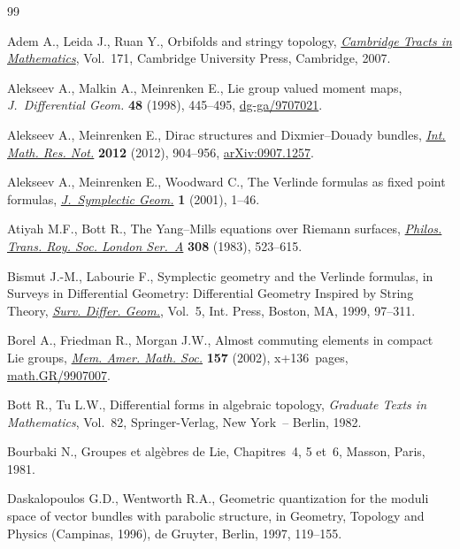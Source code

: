 \documentclass[pdftex]{sigma}
\numberwithin{equation}{section}
\begin{document}
\begin{thebibliography}{99}
\footnotesize \itemsep=0pt

Adem A., Leida J., Ruan Y., Orbifolds and stringy topology, \href{http://dx.doi.org/10.1017/CBO9780511543081}{\textit{Cambridge
  Tracts in Mathematics}}, Vol.~171, Cambridge University Press, Cambridge,
  2007.

Alekseev A., Malkin A., Meinrenken E., Lie group valued moment maps,
  \textit{J.~Differential Geom.} \textbf{48} (1998), 445--495,
  \href{http://arxiv.org/abs/dg-ga/9707021}{dg-ga/9707021}.

Alekseev A., Meinrenken E., Dirac structures and {D}ixmier--{D}ouady bundles,
  \href{http://dx.doi.org/10.1093/imrn/rnr002}{\textit{Int. Math. Res. Not.}} \textbf{2012} (2012), 904--956,
  \href{http://arxiv.org/abs/0907.1257}{arXiv:0907.1257}.

Alekseev A., Meinrenken E., Woodward C., The {V}erlinde formulas as f\/ixed point
  formulas, \href{http://dx.doi.org/10.4310/JSG.2001.v1.n1.a1}{\textit{J.~Symplectic Geom.}} \textbf{1} (2001), 1--46.

Atiyah M.F., Bott R., The {Y}ang--{M}ills equations over {R}iemann surfaces,
  \href{http://dx.doi.org/10.1098/rsta.1983.0017}{\textit{Philos. Trans. Roy. Soc. London Ser.~A}} \textbf{308} (1983),
  523--615.

Bismut J.-M., Labourie F., Symplectic geometry and the {V}erlinde formulas, in
  Surveys in Dif\/ferential Geometry: Dif\/ferential Geometry Inspired by String
  Theory, \href{http://dx.doi.org/10.4310/SDG.1999.v5.n1.a2}{\textit{Surv. Differ. Geom.}}, Vol.~5, Int. Press, Boston, MA, 1999,
  97--311.

Borel A., Friedman R., Morgan J.W., Almost commuting elements in compact {L}ie
  groups, \href{http://dx.doi.org/10.1090/memo/0747}{\textit{Mem. Amer. Math. Soc.}} \textbf{157} (2002), x+136~pages,
  \href{http://arxiv.org/abs/math.GR/9907007}{math.GR/9907007}.

Bott R., Tu L.W., Dif\/ferential forms in algebraic topology, \textit{Graduate
  Texts in Mathematics}, Vol.~82, Springer-Verlag, New York~-- Berlin, 1982.

Bourbaki N., Groupes et alg{\`e}bres de Lie, Chapitres~4, 5 et~6, Masson,
  Paris, 1981.

Daskalopoulos G.D., Wentworth R.A., Geometric quantization for the moduli space
  of vector bundles with parabolic structure, in Geometry, Topology and Physics
  ({C}ampinas, 1996), de Gruyter, Berlin, 1997, 119--155.


\end{thebibliography}
\end{document}
